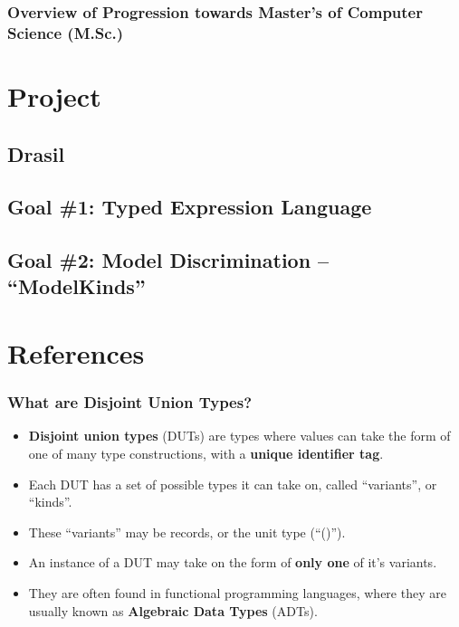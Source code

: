 \documentclass{beamer}
\begin{document}
\begin{frame}
    \frametitle{Overview of Progression towards Master's of Computer Science (M.Sc.)}
\end{frame}

\section{Project}
\subsection{Drasil}
\subsection{Goal \#1: Typed Expression Language}
\subsection{Goal \#2: Model Discrimination -- ``ModelKinds''}
\section{References}

\begin{frame}
    \frametitle{}
    \framesubtitle{}
\end{frame}


\begin{frame}
\frametitle{What are Disjoint Union Types?}

\begin{itemize}
 \item<1-> \textbf{Disjoint union types} (DUTs) are types where values can take the form of one of many type constructions, with a \textbf{unique identifier tag}.
 \item<2-> Each DUT has a set of possible types it can take on, called ``variants'', or ``kinds''.
 \item<3-> These ``variants'' may be records, or the unit type (``()'').
 \item<4-> An instance of a DUT may take on the form of \textbf{only one} of it's variants. 
 \item<5-> They are often found in functional programming languages, where they are usually known as \textbf{Algebraic Data Types} (ADTs).
\end{itemize}

\end{frame}
\end{document}
